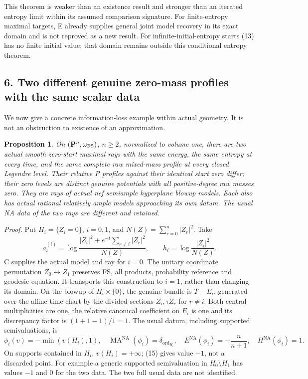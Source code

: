 \documentclass[
  11pt,
]{article}
\newtheorem{proposition}[theorem]{Proposition}
\begin{document}
This theorem is weaker than an existence result and stronger than an
iterated entropy limit within its assumed comparison signature. For
finite-entropy maximal targets, E already supplies general joint model
recovery in its exact domain and is not reproved as a new result. For
infinite-initial-entropy starts (13) has no finite initial value; that
domain remains outside this conditional entropy theorem.

\subsection{6. Two different genuine zero-mass profiles with the same
scalar
data}\label{two-different-genuine-zero-mass-profiles-with-the-same-scalar-data}

We now give a concrete information-loss example within actual geometry.
It is not an obstruction to existence of an approximation.

\begin{proposition}\label{two}
On $(\mathbf P^n,\omega_{\rm FS})$, $n\ge2$, normalized to
volume one, there are two actual smooth zero-start maximal rays with
the same energy, the same entropy at every time, and the same complete
raw mixed-mass profile at every closed Legendre level. Their relative
P profiles against their identical start zero differ; their zero levels
are distinct genuine potentials with all positive-degree raw masses zero.
They are rays of actual nef semiample hyperplane blowup models.
Each also has actual rational relatively ample models approaching its
own datum. The usual NA data of the two rays are different and retained.
\end{proposition}

\emph{Proof.} Put \(H_i=\{Z_i=0\}\), \(i=0,1\), and
\(N(Z)=\sum_{r=0}^n|Z_r|^2\). Take \[
a^{(i)}_t=\log\frac{|Z_i|^2+e^{-t}\sum_{r\ne i}|Z_r|^2}{N(Z)},
\qquad h_i=\log\frac{|Z_i|^2}{N(Z)}.                    \tag{14}
\] C supplies the actual model and ray for \(i=0\). The unitary
coordinate permutation \(Z_0\leftrightarrow Z_1\) preserves FS, all
products, probability reference and geodesic equation. It transports
this construction to \(i=1\), rather than changing its domain. On the
blowup of \(H_i\times\{0\}\), the genuine bundle is \(T-E_i\), generated
over the affine time chart by the divided sections \(Z_i,\tau Z_r\) for
\(r\ne i\). Both central multiplicities are one, the relative canonical
coefficient on \(E_i\) is one and its discrepancy factor is
\((1+1-1)/1=1\). The usual datum, including supported semivaluations, is
\[
\phi_i(v)=-\min(v(H_i),1),\quad
\operatorname{MA}^{\mathrm{NA}}(\phi_i)=\delta_{\operatorname{ord}_{H_i}},\quad
E^{\mathrm{NA}}(\phi_i)=-\frac n{n+1},\quad H^{\mathrm{NA}}(\phi_i)=1.   \tag{15}
\] On supports contained in \(H_i\), \(v(H_i)=+\infty\); (15) gives
value \(-1\), not a discarded point. For example a generic supported
semivaluation in \(H_0\setminus H_1\) has values \(-1\) and \(0\) for
the two data. The two full usual data are not identified.
\end{document}

